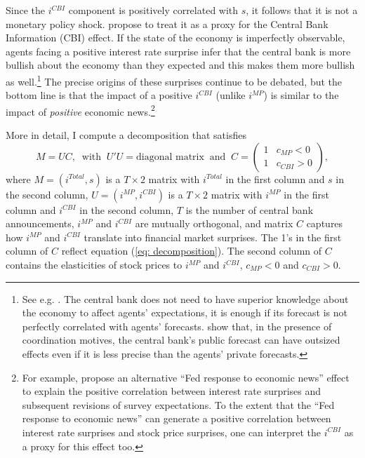 \documentclass[a4paper,12pt]{article}
\begin{document}
Since the $i^{CBI}$ component is positively correlated with $s$, it follows that it is not a monetary policy shock.
\cite{Jarocinski_Karadi_2020} propose to treat it as a proxy for the Central Bank Information (CBI) effect.
If the state of the economy is imperfectly observable, agents facing a positive interest rate surprise
infer that the central bank is more bullish about the economy than they expected 
and this makes them more bullish as well.\footnote{See e.g. \cite{Romer_Romer_2000,Melosi_2017,Nakamura_Steinsson_2018}.
The central bank does not need to have superior knowledge about the economy to affect
agents' expectations, it is enough if its forecast is not perfectly correlated with agents' forecasts. \cite{Morris_Shin_2002} show that, in the presence of coordination motives,
the central bank's public forecast can have outsized effects even if it is less precise than the agents' private forecasts.}
The precise origins of these surprises continue to be debated, but the bottom line is that the impact of a positive $i^{CBI}$ (unlike $i^{MP}$) is similar to the impact of \emph{positive} economic news.\footnote{For example, \cite{Bauer_Swanson_2020} propose
an alternative ``Fed response to economic news'' effect to explain the positive correlation between interest rate surprises and subsequent revisions of survey expectations. 
To the extent that the ``Fed response to economic news'' can generate
a positive correlation between interest rate surprises and stock price surprises, 
one can interpret the $i^{CBI}$ as a proxy for this effect too.}

More in detail, I compute a decomposition that satisfies
\begin{equation}\label{eq: rotational}
M = UC,\;\;\text{with}\;\;  U'U=\text{diagonal matrix} \;\; \text{and}\;\;
C=\begin{pmatrix}1&c_{MP}<0\\1&c_{CBI}>0\end{pmatrix},
\end{equation}
where $M=(i^{Total},s)$ is a $T \times 2$ matrix with $i^{Total}$ in the first column and $s$ in the second column,
$U=\left(i^{MP},i^{CBI}\right)$ is a $T \times 2$ matrix with $i^{MP}$ in the first column and $i^{CBI}$ in the second column, $T$ is the number of central bank announcements,
$i^{MP}$ and $i^{CBI}$ are mutually orthogonal, and matrix $C$ captures how $i^{MP}$ and $i^{CBI}$ translate
into financial market surprises. The 1's in the first column of $C$ reflect equation (\ref{eq: decomposition}).
The second column of $C$ contains the elasticities of stock prices to $i^{MP}$ and $i^{CBI}$, $c_{MP}<0$ and $c_{CBI}>0$.
\end{document}
